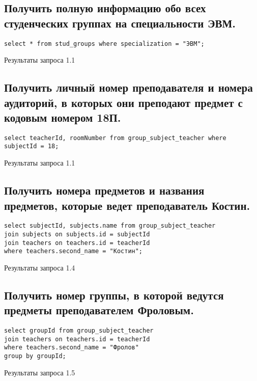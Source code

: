 \documentclass[a4paper,8pt]{article}
\begin{document}
\subsection{Получить полную информацию обо всех студенческих группах на специальности ЭВМ.}
\begin{verbatim}
select * from stud_groups where specialization = "ЭВМ";
\end{verbatim}
\begin{table}[H]
\centering

\caption{Результаты запроса 1.1}
\end{table}

\subsection{Получить личный номер преподавателя и номера аудиторий, в которых они преподают предмет с кодовым номером 18П.}
\begin{verbatim}
select teacherId, roomNumber from group_subject_teacher where subjectId = 18;
\end{verbatim}
\begin{table}[H]
\centering

\caption{Результаты запроса 1.1}
\end{table}

\subsection{Получить номера предметов и названия предметов, которые ведет преподаватель Костин.}
\begin{verbatim}
select subjectId, subjects.name from group_subject_teacher
join subjects on subjects.id = subjectId
join teachers on teachers.id = teacherId
where teachers.second_name = "Костин";
\end{verbatim}
\begin{table}[H]
\centering

\caption{Результаты запроса 1.4}
\end{table}

\subsection{Получить номер группы, в которой ведутся предметы преподавателем Фроловым.}
\begin{verbatim}
select groupId from group_subject_teacher
join teachers on teachers.id = teacherId
where teachers.second_name = "Фролов"
group by groupId;
\end{verbatim}
\begin{table}[H]
\centering

\caption{Результаты запроса 1.5}
\end{table}
\end{document}
